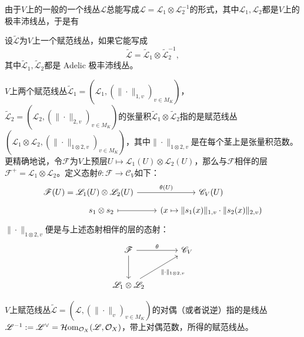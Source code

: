 

由于$V$上的一般的一个线丛$\mathscr{L}$总能写成$\mathscr{L} = \mathscr{L}_1\otimes \mathscr{L}_2^{-1}$的形式，其中$\mathscr{L}_1, \mathscr{L}_2$都是$V$上的极丰沛线丛，于是有
\begin{definition}
设$\widetilde{\mathscr{L}}$为$V$上一个赋范线丛，如果它能写成
\begin{equation}
\widetilde{\mathscr{L}} = \widetilde{\mathscr{L}}_1 \otimes \widetilde{\mathscr{L}}_2^{-1},
\end{equation}
其中$\widetilde{\mathscr{L}}_1, \widetilde{\mathscr{L}}_2$都是 Adelic 极丰沛线丛。
\end{definition}

\begin{remark} \label{tensor and dual of adelic line bundle}
$V$上两个赋范线丛$\widetilde{\mathscr{L}}_1 = (\mathscr{L}_1, (\|\cdot\|_{1,v})_{v\in M_K})$，$\widetilde{\mathscr{L}}_2 = (\mathscr{L}_2, (\|\cdot\|_{2,v})_{v\in M_K})$的张量积$\widetilde{\mathscr{L}}_1 \otimes \widetilde{\mathscr{L}}_2$指的是赋范线丛$(\mathscr{L}_1\otimes \mathscr{L}_2, (\|\cdot\|_{1\otimes 2,v})_{v\in M_K})$，其中$\|\cdot\|_{1\otimes 2,v}$是在每个茎上是张量积范数。更精确地说，令$\mathscr{F}$为$V$上预层$U \mapsto \mathscr{L}_1(U)\otimes \mathscr{L}_2(U)$，那么与$\mathscr{F}$相伴的层$\mathscr{F}^+ = \mathscr{L}_1\otimes \mathscr{L}_2$。定义态射$\theta: \mathscr{F} \longrightarrow \mathscr{C}_V$如下：
\begin{equation}
\begin{tikzcd}[row sep = tiny]
\mathscr{F}(U) = \mathscr{L}_1(U)\otimes \mathscr{L}_2(U) \arrow[r, "\theta(U)"] & \mathscr{C}_V(U) \\
\phantom{hehehe} s_1\otimes s_2 \arrow[r, mapsto] & (x \mapsto \|s_1(x)\|_{1,v}\cdot\|s_2(x)\|_{2,v})
\end{tikzcd}
\end{equation}
$\|\cdot\|_{1\otimes 2,v}$便是与上述态射相伴的层的态射：
\begin{equation}
\begin{tikzcd}[row sep = large, column sep = large]
\mathscr{F} \arrow[d] \arrow[r, "\theta"] & \mathscr{C}_V \\
\mathscr{L}_1\otimes \mathscr{L}_2 \arrow[ur, "\|\cdot\|_{1\otimes 2,v}"']
\end{tikzcd}
\end{equation}

$V$上赋范线丛$\widetilde{\mathscr{L}} = (\mathscr{L}, (\|\cdot\|_{v})_{v\in M_K})$的对偶（或者说逆）指的是线丛$\mathscr{L}^{-1} := \mathscr{L}^{\vee} = \operatorname{\mathcal{H}om}_{\mathcal{O}_X}(\mathscr{L}, \mathcal{O}_X)$，带上对偶范数，所得的赋范线丛。
\end{remark}

